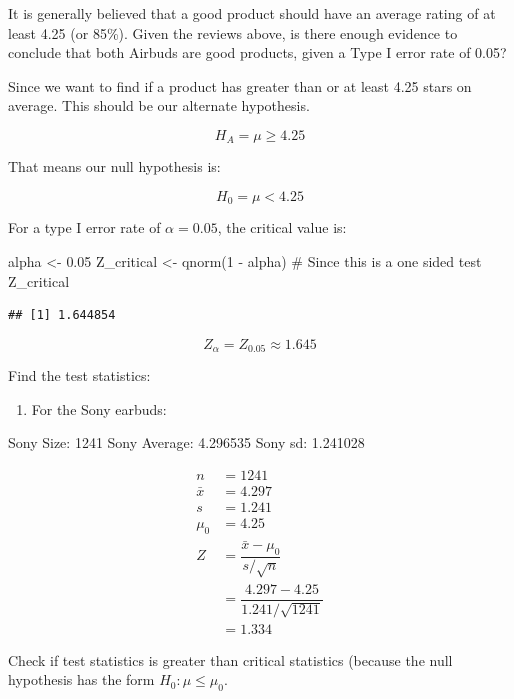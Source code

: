 \documentclass[
]{article}
\newenvironment{Shaded}{\begin{snugshade}}{\end{snugshade}}
\newcommand{\CommentTok}[1]{\textcolor[rgb]{0.50,0.62,0.50}{#1}}
\newcommand{\DecValTok}[1]{\textcolor[rgb]{0.86,0.86,0.80}{#1}}
\newcommand{\FloatTok}[1]{\textcolor[rgb]{0.75,0.75,0.82}{#1}}
\newcommand{\FunctionTok}[1]{\textcolor[rgb]{0.94,0.94,0.56}{#1}}
\newcommand{\NormalTok}[1]{\textcolor[rgb]{0.80,0.80,0.80}{#1}}
\newcommand{\OtherTok}[1]{\textcolor[rgb]{0.94,0.94,0.56}{#1}}
\newcommand{\SpecialCharTok}[1]{\textcolor[rgb]{0.86,0.64,0.64}{#1}}
\providecommand{\tightlist}{%
  \setlength{\itemsep}{0pt}\setlength{\parskip}{0pt}}
\begin{document}
It is generally believed that a good product should have an average
rating of at least 4.25 (or 85\%). Given the reviews above, is there
enough evidence to conclude that both Airbuds are good products, given a
Type I error rate of 0.05?

Since we want to find if a product has greater than or at least 4.25
stars on average. This should be our alternate hypothesis.

\[
H_A = \mu \geq 4.25
\]

That means our null hypothesis is:

\[
H_0 = \mu < 4.25
\]

For a type I error rate of \(\alpha = 0.05\), the critical value is:

\begin{Shaded}
\begin{Highlighting}[]
\NormalTok{alpha }\OtherTok{\textless{}{-}} \FloatTok{0.05}
\NormalTok{Z\_critical }\OtherTok{\textless{}{-}} \FunctionTok{qnorm}\NormalTok{(}\DecValTok{1} \SpecialCharTok{{-}}\NormalTok{ alpha) }\CommentTok{\# Since this is a one sided test}
\NormalTok{Z\_critical}
\end{Highlighting}
\end{Shaded}

\begin{verbatim}
## [1] 1.644854
\end{verbatim}

\[
Z_{\alpha} = Z_{0.05} \approx 1.645
\]

Find the test statistics:

\begin{enumerate}
\def\labelenumi{\alph{enumi})}
\tightlist
\item
  For the Sony earbuds:
\end{enumerate}

Sony Size: 1241 Sony Average: 4.296535 Sony sd: 1.241028

\[
\begin{aligned}
n &= 1241\\
\bar{x} &= 4.297\\
s &= 1.241\\
\mu_0 &= 4.25 \\
Z &= \dfrac{\bar{x} - \mu_0}{s/\sqrt{n}}\\
&= \dfrac{4.297 - 4.25}{1.241/\sqrt{1241}}\\
&= 1.334
\end{aligned}
\]

Check if test statistics is greater than critical statistics (because
the null hypothesis has the form \(H_0: \mu \leq \mu_0\).
\end{document}
